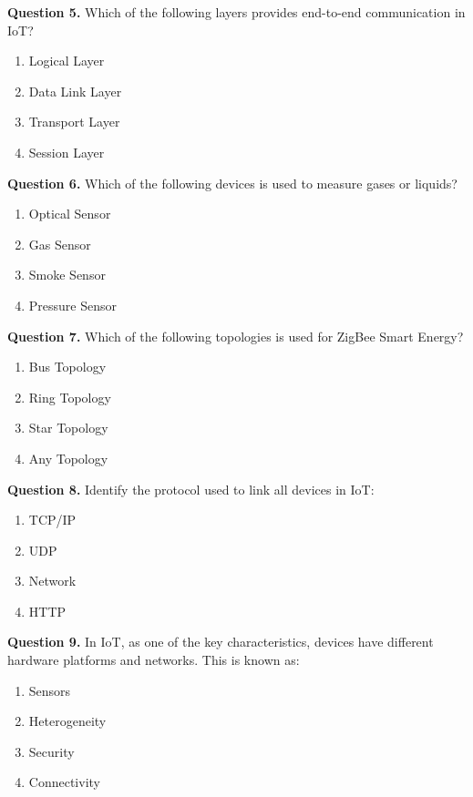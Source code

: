 \documentclass[11pt,a4paper]{article}
\begin{document}
\medskip\noindent\textbf{Question 5.} Which of the following layers provides end-to-end communication in IoT?
\begin{enumerate}[label=(\alph*),itemsep=2pt]
  \item Logical Layer
  \item Data Link Layer
  \item Transport Layer
  \item Session Layer
\end{enumerate}

\medskip\noindent\textbf{Question 6.} Which of the following devices is used to measure gases or liquids?
\begin{enumerate}[label=(\alph*),itemsep=2pt]
  \item Optical Sensor
  \item Gas Sensor
  \item Smoke Sensor
  \item Pressure Sensor
\end{enumerate}

\medskip\noindent\textbf{Question 7.} Which of the following topologies is used for ZigBee Smart Energy?
\begin{enumerate}[label=(\alph*),itemsep=2pt]
  \item Bus Topology
  \item Ring Topology
  \item Star Topology
  \item Any Topology
\end{enumerate}

\medskip\noindent\textbf{Question 8.} Identify the protocol used to link all devices in IoT:
\begin{enumerate}[label=(\alph*),itemsep=2pt]
  \item TCP/IP
  \item UDP
  \item Network
  \item HTTP
\end{enumerate}

\medskip\noindent\textbf{Question 9.} In IoT, as one of the key characteristics, devices have different hardware platforms and networks. This is known as:
\begin{enumerate}[label=(\alph*),itemsep=2pt]
  \item Sensors
  \item Heterogeneity
  \item Security
  \item Connectivity
\end{enumerate}
\end{document}
